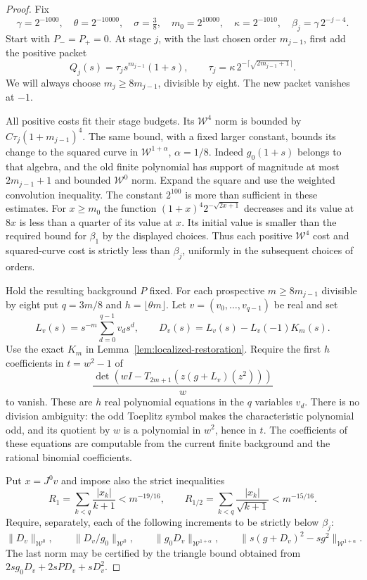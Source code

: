 \documentclass[11pt]{article}
\begin{document}
\begin{proof}
Fix
\[
 \gamma=2^{-1000},\quad \theta=2^{-10000},\quad
 \sigma=\tfrac38,\quad m_0=2^{10000},\quad
 \kappa=2^{-1010},\quad \beta_j=\gamma\,2^{-j-4}.
\]
Start with $P_-=P_+=0$. At stage $j$, with the last chosen order
$m_{j-1}$, first add the positive packet
\[
 Q_j(s)=\tau_j s^{m_{j-1}}(1+s),\qquad
 \tau_j=\kappa\,2^{-\lceil\sqrt{2m_{j-1}+1}\rceil}.
\]
We will always choose $m_j\ge8m_{j-1}$, divisible by eight.
The new packet vanishes at $-1$.

All positive costs fit their stage budgets. Its $\mathcal W^4$ norm
is bounded by $C\tau_j(1+m_{j-1})^4$. The same bound, with a fixed
larger constant, bounds its change to the squared curve in
$\mathcal W^{1+\alpha}$, $\alpha=1/8$. Indeed
$g_0(1+s)$ belongs to that algebra, and the old finite polynomial
has support of magnitude at most $2m_{j-1}+1$ and bounded
$\mathcal W^0$ norm. Expand the square and use the weighted
convolution inequality. The constant $2^{100}$ is more than
sufficient in these estimates. For $x\ge m_0$ the function
$(1+x)^4 2^{-\sqrt{2x+1}}$ decreases and its value at $8x$
is less than a quarter of its value at $x$. Its initial value
is smaller than the required bound for $\beta_1$ by the displayed
choices. Thus each positive $\mathcal W^4$ cost and squared-curve
cost is strictly less than $\beta_j$, uniformly in the subsequent
choices of orders.

Hold the resulting background $P$ fixed. For each prospective
$m\ge8m_{j-1}$ divisible by eight put
$q=3m/8$ and $h=\lfloor\theta m\rfloor$.
Let $v=(v_0,\ldots,v_{q-1})$ be real and set
\[
 L_v(s)=s^{-m}\sum_{d=0}^{q-1}v_ds^d,\qquad
 D_v(s)=L_v(s)-L_v(-1)K_m(s).
\]
Use the exact $K_m$ in Lemma~\ref{lem:localized-restoration}.
Require the first $h$ coefficients in $t=w^2-1$ of
\[
 \frac{\det(wI-T_{2m+1}(z(g+L_v)(z^2)))}{w}
\]
to vanish. These are $h$ real polynomial equations in the $q$
variables $v_d$. There is no division ambiguity: the odd Toeplitz
symbol makes the characteristic polynomial odd, and its quotient
by $w$ is a polynomial in $w^2$, hence in $t$.
The coefficients of these equations are computable from the
current finite background and the rational binomial coefficients.

Put $x=J^0v$ and impose also the strict inequalities
\[
 R_1=\sum_{k<q}\frac{|x_k|}{k+1}<m^{-19/16},\qquad
 R_{1/2}=\sum_{k<q}\frac{|x_k|}{\sqrt{k+1}}<m^{-15/16}.
\]
Require, separately, each of the following increments to be
strictly below $\beta_j$:
\[
 \|D_v\|_{\mathcal W^0},\qquad
 \|D_v/g_0\|_{\mathcal W^0},\qquad
 \|g_0D_v\|_{\mathcal W^{1+\alpha}},\qquad
 \|s(g+D_v)^2-sg^2\|_{\mathcal W^{1+\alpha}}.
\]
The last norm may be certified by the triangle bound obtained
from $2sg_0D_v+2sPD_v+sD_v^2$.


\end{proof}
\end{document}
